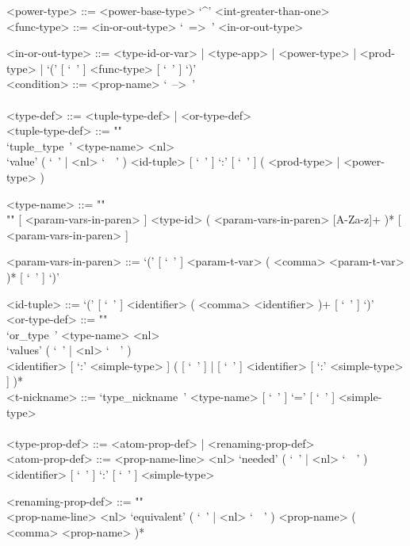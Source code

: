 \documentclass{article}
\begin{document}
\begin{grammar}
<power-type> ::= <power-base-type> `^' <int-greater-than-one>
\\

<func-type> ::= <in-or-out-type> `\ =>\ ' <in-or-out-type>

<in-or-out-type> ::=
<type-id-or-var> | <type-app> | <power-type> | <prod-type> |
`(' [ `\ ' ] <func-type>  [ `\ ' ] `)'
\\

<condition> ::= <prop-name> `\ -->\ ' 
\\
\\

\newpage
<type-def> ::= <tuple-type-def> | <or-type-def>
\\

<tuple-type-def> ::= ""\\
`tuple_type\ ' <type-name> <nl> \\
`value' ( `\ ' | <nl> `\ \ ' )
<id-tuple> [ `\ ' ] `:' [ `\ ' ] ( <prod-type> | <power-type> )

<type-name> ::= ""\\""
[ <param-vars-in-paren> ] <type-id> ( <param-vars-in-paren> [A-Za-z]+ )*
[ <param-vars-in-paren> ]

<param-vars-in-paren> ::=
`(' [ `\ ' ] <param-t-var> ( <comma> <param-t-var> )* [ `\ ' ] `)'

<id-tuple> ::= `(' [ `\ ' ] <identifier> ( <comma> <identifier> )+ [ `\ ' ] `)'
\\

<or-type-def> ::= ""\\
`or_type\ ' <type-name> <nl> \\
`values' ( `\ ' | <nl> `\ \ ' ) \\ 
<identifier> [ `:' <simple-type> ]
( [ `\ ' ] | [ `\ ' ] <identifier> [ `:' <simple-type> ] )*
\\

<t-nickname> ::=
`type_nickname\ ' <type-name> [ `\ ' ] `=' [ `\ ' ] <simple-type>
\\\\

<type-prop-def> ::= <atom-prop-def> | <renaming-prop-def>
\\

<atom-prop-def> ::=
<prop-name-line> <nl> `needed' ( `\ ' | <nl> `\ \ ' )
<identifier> [ `\ ' ] `:' [ `\ ' ] <simple-type>

<renaming-prop-def> ::= ""\\
<prop-name-line> <nl>
`equivalent' ( `\ ' | <nl> `\ \ ' ) <prop-name> ( <comma> <prop-name> )*


\end{grammar}
\end{document}
